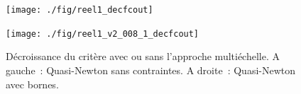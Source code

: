 \begin{figure}[!htbp]

\begin{center}
\begin{minipage}{5.8cm}
\centerline{\texttt{[image: ./fig/reel1\_decfcout]}
}
\end{minipage}
\hspace*{0.1cm}
\begin{minipage}{5.8cm}
\centerline{\texttt{[image: ./fig/reel1\_v2\_008\_1\_decfcout]}
}
\end{minipage}
\end{center}

\caption{D\'ecroissance du crit\`ere avec ou sans l'approche 
multi\'echelle. A gauche~: Quasi-Newton sans contraintes. 
A droite~: Quasi-Newton avec bornes.
}
\label{FIG:REEL1_DECFCOUT}
\end{figure}
